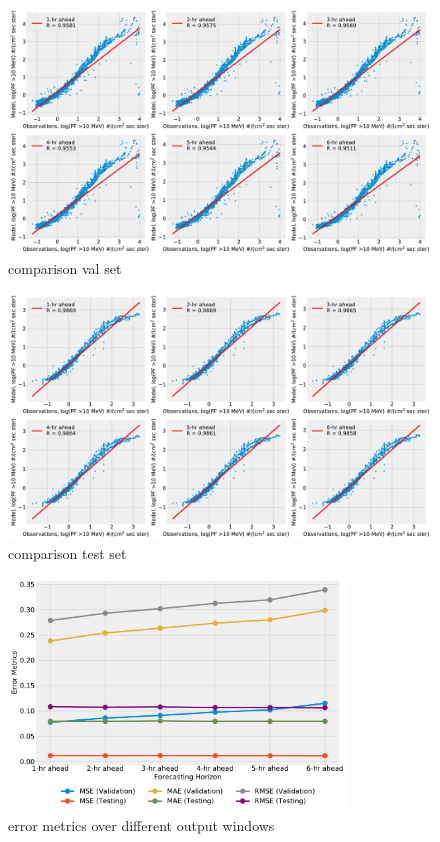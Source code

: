 



\begin{figure}[!htp]
	\centering
	\includegraphics[width=\textwidth]{chapter4/figs/hourly_PF10/scatterplot_obs_vs_model_valset.pdf}
	\caption{comparison val set}
	\label{fig_1}
\end{figure}

\begin{figure}[!htp]
	\centering
	\includegraphics[width=\textwidth]{chapter4/figs/hourly_PF10/scatterplot_obs_vs_model_tstset.pdf}
	\caption{comparison test set}
	\label{fig_2}
\end{figure}

\begin{figure}[!htp]
	\centering
	\includegraphics[width=0.8\textwidth]{chapter4/figs/hourly_PF10/scatter_error_metrics.pdf}
	\caption{error metrics over different output windows}
	\label{fig_3}
\end{figure}

